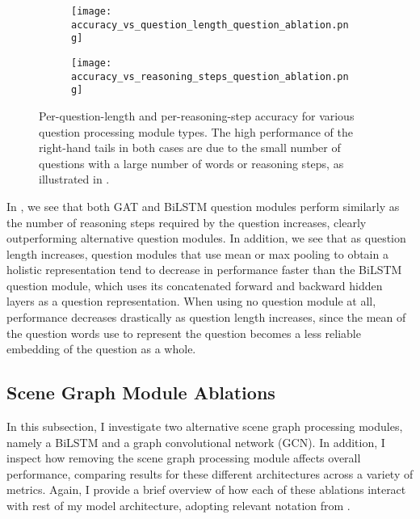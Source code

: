 \begin{figure}[htbp]
    \centering
    \begin{subfigure}[l]{0.5\textwidth}
        \texttt{[image: accuracy\_vs\_question\_length\_question\_ablation.png]}
        \label{fig:accuracy_vs_question_length_question_ablation}
    \end{subfigure}
    \begin{subfigure}[r]{0.49\textwidth}
        \texttt{[image: accuracy\_vs\_reasoning\_steps\_question\_ablation.png]}
        \label{fig:accuracy_vs_reasoning_steps_question_ablation}
    \end{subfigure}
    \caption{Per-question-length and per-reasoning-step accuracy for various question processing module types. The high performance of the right-hand tails in both cases are due to the small number of questions with a large number of words or reasoning steps, as illustrated in \figureautorefname{ \ref{fig:test_reasoning_step_and_question_length_distribution}}.}
    \label{fig:accuracy_vs_question_length_and_reasoning_steps_question_ablation}
\end{figure}

In \figureautorefname{ \ref{fig:accuracy_vs_question_length_and_reasoning_steps_question_ablation}}, we see that both GAT and BiLSTM question modules perform similarly as the number of reasoning steps required by the question increases, clearly outperforming alternative question modules. In addition, we see that as question length increases, question modules that use mean or max pooling to obtain a holistic representation tend to decrease in performance faster than the BiLSTM question module, which uses its concatenated forward and backward hidden layers as a question representation. When using no question module at all, performance decreases drastically as question length increases, since the mean of the question words use to represent the question becomes a less reliable embedding of the question as a whole.

\subsection{Scene Graph Module Ablations}
\label{subsec:scene_graph_module_ablations}

In this subsection, I investigate two alternative scene graph processing modules, namely a BiLSTM and a graph convolutional network (GCN). In addition, I inspect how removing the scene graph processing module affects overall performance, comparing results for these different architectures across a variety of metrics. Again, I provide a brief overview of how each of these ablations interact with rest of my model architecture, adopting relevant notation from \chapterautorefname{ \ref{chapter:methodology}}.

